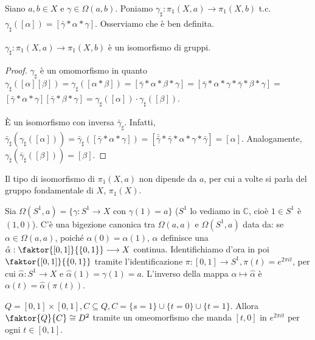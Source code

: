 Siano $a, b \in X$ e $\gamma \in \Omega(a, b)$. Poniamo $\gamma_{\sharp}: \pi_1(X, a) \longrightarrow \pi_1(X, b)$ t.c. $\gamma_{\sharp}([\alpha])=[\bar{\gamma} * \alpha * \gamma]$. Osserviamo che è ben definita.

\begin{thm}
  $\gamma_{\sharp}: \pi_1(X, a) \longrightarrow \pi_1(X, b)$ è un isomorfismo di gruppi.
  \begin{proof}
    $\gamma_{\sharp}$ è un omomorfismo in quanto $\gamma_{\sharp}([\alpha][\beta])=\gamma_{\sharp}([\alpha * \beta])=[\bar{\gamma} * \alpha * \beta * \gamma]=[\bar{\gamma} * \alpha * \gamma * \bar{\gamma} * \beta * \gamma]=$
    $[\bar{\gamma} * \alpha * \gamma][\bar{\gamma} * \beta * \gamma]=\gamma_{\sharp}([\alpha]) \cdot \gamma_{\sharp}([\beta])$.

    È un isomorfismo con inversa $\bar{\gamma}_{\sharp}$. Infatti,
    $\bar{\gamma}_{\sharp}(\gamma_{\sharp}([\alpha]))=\bar{\gamma}_{\sharp}([\bar{\gamma} * \alpha * \gamma])=[\bar{\bar{\gamma}} * \bar{\gamma} * \alpha * \gamma * \bar{\gamma}]=[\alpha]$.
    Analogamente, $\gamma_{\sharp}(\bar{\gamma}_{\sharp}([\beta]))=[\beta]$.
  \end{proof}
\end{thm}

\begin{cor}
  Il tipo di isomorfismo di $\pi_1(X, a)$ non dipende da $a$, per cui a volte si parla del gruppo fondamentale di $X$, $\pi_1(X)$.
\end{cor}

\begin{defn}
  Sia $\Omega(S^1, a)=\{ \gamma: S^1 \longrightarrow X \text{ con } \gamma(1)=a\}$ ($S^1$ lo vediamo in $\mathbb{C}$, cioè $1 \in S^1$ è $(1, 0)$). C'è una bigezione canonica tra $\Omega(a, a)$ e $\Omega(S^1, a)$ data da: se $\alpha \in \Omega(a, a)$, poiché
  $\alpha(0)=\alpha(1)$, $\alpha$ definisce una $\hat{\alpha}: \faktor{[0, 1]}{\{0, 1\}} \longrightarrow X$ continua. Identifichiamo d'ora in poi $\faktor{[0, 1]}{\{0, 1\}}$ tramite l'identificazione $\pi: [0, 1] \longrightarrow S^1, \pi(t)=e^{2 \pi i t}$, per cui
  $\hat{\alpha}:S^1 \longrightarrow X$ e $\hat{\alpha}(1)=\gamma(1)=a$. L'inverso della mappa $\alpha \longmapsto \hat{\alpha}$ è $\alpha(t)=\hat{\alpha}(\pi(t))$.
\end{defn}

\begin{lm} \label{Q/C=D^2}
  $Q=[0, 1] \times [0, 1], C \subseteq Q, C=\{s=1\} \cup \{t=0\} \cup \{t=1\}$. Allora $\faktor{Q}{C} \cong D^2$ tramite un omeomorfismo che manda $[t, 0]$ in $e^{2 \pi i t}$ per ogni $t \in [0, 1]$.
\end{lm}

